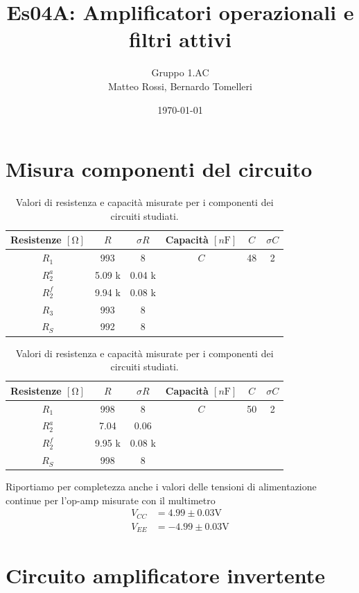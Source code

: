 \documentclass[10pt, a4paper, italian]{article}
\author{Gruppo 1.AC \\ Matteo Rossi, Bernardo Tomelleri}
\title{Es04A: Amplificatori operazionali e filtri attivi}
\begin{document}
\date{\today}
\maketitle

\setcounter{section}{0}

\section*{Misura componenti del circuito}
\begin{table}[htbp]
\centering
\begin{tabular}{cccccc}
\toprule
Resistenze $[\si{\ohm}]$ & $R$ & $\sigma R$ & Capacità $[\si{n\F}]$ & $C$ &
$\sigma C$ \\
\midrule
\midrule
$R_1$	  & 993 	& 8 	 & $C$ & 48			 & 2 \\
$R_2^a$	  & 5.09 k	& 0.04 k 	 & & &	\\
$R_2^f$	  & 9.94 k		& 0.08 k & 		& 		 &	\\
$R_3$	  & 993		& 8		 &				&				 &		\\
$R_S$	  & 992		& 8		 &				&				 &		\\
\bottomrule     
\end{tabular}
\caption{Valori di resistenza e capacità misurate per i componenti dei
circuiti studiati. \label{tab: rcmes_B}}

\begin{tabular}{cccccc}
\toprule
Resistenze $[\si{\ohm}]$ & $R$ & $\sigma R$ & Capacità $[\si{n\F}]$ & $C$ &
$\sigma C$ \\
\midrule
\midrule
$R_1$	  & 998 	& 8 	 & $C$ & 50			 & 2 \\
$R_2^a$	  & 7.04	& 0.06 	 & & &	\\
$R_2^f$	  & 9.95 k	& 0.08 k & & &	\\
$R_S$	  & 998		& 8		 & & &	\\
\bottomrule     
\end{tabular}
\caption{Valori di resistenza e capacità misurate per i componenti dei
circuiti studiati. \label{tab: rcmes_M}}
\end{table}
Riportiamo per completezza anche i valori delle tensioni di alimentazione
continue per l'op-amp misurate con il multimetro
\begin{align*}
V_{CC} &= 4.99 \pm 0.03 \si{\V} \\
V_{EE} &= -4.99 \pm 0.03 \si{\V}
\end{align*}

\section{Circuito amplificatore invertente}
\end{document}
